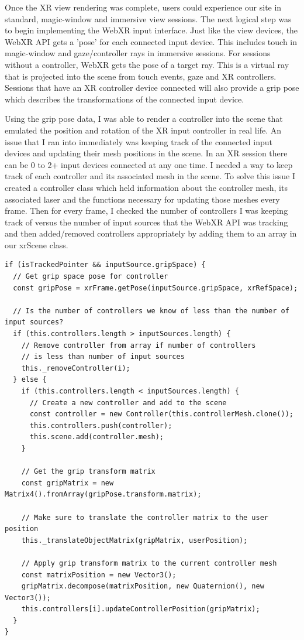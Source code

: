 \documentclass[onecolumn, draftclsnofoot,10pt, compsoc]{IEEEtran}
\begin{document}
    Once the XR view rendering was complete, users could experience our site in standard, magic-window and immersive view sessions. The next logical step was to begin implementing the WebXR input interface. Just like the view devices, the WebXR API gets a 'pose' for each connected input device. This includes touch in magic-window and gaze/controller rays in immersive sessions. For sessions without a controller, WebXR gets the pose of a target ray. This is a virtual ray that is projected into the scene from touch events, gaze and XR controllers. Sessions that have an XR controller device connected will also provide a grip pose which describes the transformations of the connected input device.
    
    Using the grip pose data, I was able to render a controller into the scene that emulated the position and rotation of the XR input controller in real life. An issue that I ran into immediately was keeping track of the connected input devices and updating their mesh positions in the scene. In an XR session there can be 0 to 2+ input devices connected at any one time. I needed a way to keep track of each controller and its associated mesh in the scene. To solve this issue I created a controller class which held information about the controller mesh, its associated laser and the functions necessary for updating those meshes every frame. Then for every frame, I checked the number of controllers I was keeping track of versus the number of input sources that the WebXR API was tracking and then added/removed controllers appropriately by adding them to an array in our xrScene class.
    \begin{lstlisting}
if (isTrackedPointer && inputSource.gripSpace) {
  // Get grip space pose for controller
  const gripPose = xrFrame.getPose(inputSource.gripSpace, xrRefSpace);

  // Is the number of controllers we know of less than the number of input sources?
  if (this.controllers.length > inputSources.length) {
    // Remove controller from array if number of controllers
    // is less than number of input sources
    this._removeController(i);
  } else {
    if (this.controllers.length < inputSources.length) {
      // Create a new controller and add to the scene
      const controller = new Controller(this.controllerMesh.clone());
      this.controllers.push(controller);
      this.scene.add(controller.mesh);
    }

    // Get the grip transform matrix
    const gripMatrix = new Matrix4().fromArray(gripPose.transform.matrix);

    // Make sure to translate the controller matrix to the user position
    this._translateObjectMatrix(gripMatrix, userPosition);

    // Apply grip transform matrix to the current controller mesh
    const matrixPosition = new Vector3();
    gripMatrix.decompose(matrixPosition, new Quaternion(), new Vector3());
    this.controllers[i].updateControllerPosition(gripMatrix);
  }
}
    \end{lstlisting}
    
\end{document}
